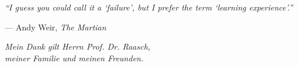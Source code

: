 
\thispagestyle{empty}
\vspace*{0.1\textheight}
\noindent\emph{\enquote{I guess you could call it a \enquote{failure}, but I prefer the term \enquote{learning
experience}.}}\bigbreak

\hfill --- Andy Weir, \textit{The Martian}

\vfill{}
\begin{flushright}
\emph{Mein Dank gilt Herrn Prof. Dr. Raasch, \\meiner Familie und meinen Freunden.}
\end{flushright}
\vspace*{0.1\textheight}
\cleardoublepage
